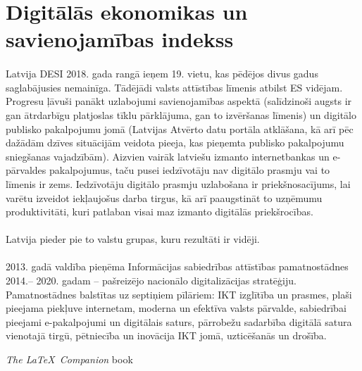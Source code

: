 \section{Digitālās ekonomikas un savienojamības indekss}
\paragraph{}
Latvija DESI 2018. gada rangā ieņem 19. vietu, kas pēdējos divus gadus saglabājusies
nemainīga. Tādējādi valsts attīstības līmenis atbilst ES vidējam. Progresu ļāvuši panākt
uzlabojumi savienojamības aspektā (salīdzinoši augsts ir gan ātrdarbīgu platjoslas tīklu
pārklājuma, gan to izvēršanas līmenis) un digitālo publisko pakalpojumu jomā (Latvijas
Atvērto datu portāla atklāšana, kā arī pēc dažādām dzīves situācijām veidota pieeja, kas
pieņemta publisko pakalpojumu sniegšanas vajadzībām). Aizvien vairāk latviešu izmanto
internetbankas un e-pārvaldes pakalpojumus, taču pusei iedzīvotāju nav digitālo prasmju vai
to līmenis ir zems. Iedzīvotāju digitālo prasmju uzlabošana ir priekšnosacījums, lai varētu
izveidot iekļaujošus darba tirgus, kā arī paaugstināt to uzņēmumu produktivitāti, kuri patlaban
visai maz izmanto digitālās priekšrocības.
\paragraph{}
Latvija pieder pie to valstu grupas, kuru rezultāti ir vidēji.
\paragraph{}
2013. gadā valdība pieņēma Informācijas sabiedrības attīstības pamatnostādnes 2014.–
2020. gadam – pašreizējo nacionālo digitalizācijas stratēģiju. Pamatnostādnes balstītas uz
septiņiem pīlāriem: IKT izglītība un prasmes, plaši pieejama piekļuve internetam, moderna
un efektīva valsts pārvalde, sabiedrībai pieejami e-pakalpojumi un digitālais saturs,
pārrobežu sadarbība digitālā satura vienotajā tirgū, pētniecība un inovācija IKT jomā,
uzticēšanās un drošība.

\textit{The \LaTeX\ Companion} book \cite{latexcompanion}
